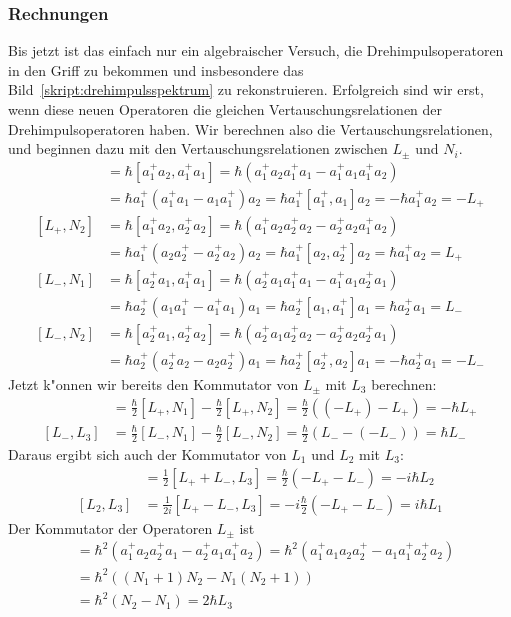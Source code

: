 \subsubsection{Rechnungen}
Bis jetzt ist das einfach nur ein algebraischer Versuch, die
Drehimpulsoperatoren in den Griff zu bekommen und insbesondere
das Bild~\ref{skript:drehimpulsspektrum} zu rekonstruieren.
Erfolgreich sind wir erst, wenn diese neuen Operatoren die gleichen
Vertauschungsrelationen der Drehimpulsoperatoren haben.
Wir berechnen also die Vertauschungsrelationen, und beginnen dazu mit
den Vertauschungsrelationen zwischen $L_\pm$ und $N_i$.
\begin{align*}
[L_+,N_1]
&=
\hbar[a_1^+a_2,a_1^+a_1]
=
\hbar( a_1^+a_2 a_1^+a_1 - a_1^+a_1 a_1^+a_2)
\\
&=
\hbar a_1^+( a_1^+a_1 - a_1 a_1^+)a_2
=
\hbar a_1^+[ a_1^+,a_1]a_2
=
-\hbar a_1^+a_2
=-L_+
\\
[L_+,N_2]
&=
\hbar[a_1^+a_2,a_2^+a_2]
=
\hbar( a_1^+a_2 a_2^+a_2 - a_2^+a_2 a_1^+a_2)
\\
&=
\hbar a_1^+( a_2 a_2^+ - a_2^+a_2)a_2
=
\hbar a_1^+[a_2,a_2^+]a_2
=
\hbar a_1^+a_2
=
L_+
\\
[L_-,N_1]
&=
\hbar[a_2^+a_1,a_1^+a_1]
=
\hbar( a_2^+a_1 a_1^+a_1 - a_1^+a_1 a_2^+a_1)
\\
&=
\hbar a_2^+(a_1 a_1^+ - a_1^+a_1)a_1
=
\hbar a_2^+[a_1,a_1^+]a_1
=
\hbar a_2^+a_1
=
L_-
\\
[L_-,N_2]
&=
\hbar[a_2^+a_1,a_2^+a_2]
=
\hbar( a_2^+a_1 a_2^+a_2 - a_2^+a_2 a_2^+a_1)
\\
&=
\hbar a_2^+(a_2^+a_2 - a_2 a_2^+) a_1
=
\hbar a_2^+[a_2^+,a_2] a_1
=
-\hbar a_2^+a_1
=-L_-
\end{align*}
Jetzt k"onnen wir bereits den Kommutator von $L_\pm$ mit $L_3$
berechnen:
\begin{align*}
[L_+,L_3]
&=
\frac{\hbar}2[L_+,N_1]
-
\frac{\hbar}2[L_+,N_2]
=
\frac{\hbar}2((-L_+)-L_+)=-\hbar L_+
\\
[L_-,L_3]
&=
\frac{\hbar}2[L_-,N_1]
-
\frac{\hbar}2[L_-,N_2]
=
\frac{\hbar}2(L_--(-L_-))
=\hbar L_-
\end{align*}
Daraus ergibt sich auch der Kommutator von $L_1$ und $L_2$ mit $L_3$:
\begin{align*}
[L_1,L_3]
&=
\frac12[L_++L_-,L_3]
=
\frac{\hbar}2(-L_+-L_-)
=
-i\hbar L_2
\\
[L_2,L_3]
&=
\frac1{2i}[L_+-L_-,L_3]
=
-i\frac{\hbar}{2}(-L_+-L_-)
=
i\hbar L_1
\end{align*}
Der Kommutator der Operatoren $L_\pm$ ist
\begin{align*}
[L_+,L_-]
&=
\hbar^2(a_1^+a_2a_2^+a_1-a_2^+a_1a_1^+a_2)
=
\hbar^2(
a_1^+
a_1
a_2
a_2^+
-
a_1
a_1^+
a_2^+
a_2
)
\\
&=
\hbar^2
(
(N_1+1)N_2
-
N_1(N_2+1)
)
\\
&=
\hbar^2
(
N_2
-
N_1
)
=2\hbar L_3
\end{align*}
